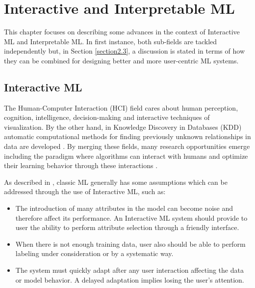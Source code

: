 
\chapter{Interactive and Interpretable ML}
\label{chapter2}

\graphicspath{{Chapter2/figs/}}

This chapter focuses on describing some advances in the context of Interactive ML and Interpretable ML. In first instance, both sub-fields are tackled independently but, in Section \ref{section2.3}, a discussion is stated in terms of how they can be combined for designing better and more user-centric ML systems.

\section{Interactive ML} %
\label{section2.1}

The Human-Computer Interaction (HCI) field cares about human perception, cognition, intelligence, decision-making and interactive techniques of visualization. By the other hand, in Knowledge Discovery in Databases (KDD) automatic computational methods for finding previously unknown relationships in data are developed \cite{Holzinger2013}. By merging these fields, many research opportunities emerge including the paradigm where algorithms can interact with humans and optimize their learning behavior through these interactions \cite{Holzinger2016}. 

As described in \cite{Fails2003}, classic ML generally has some assumptions which can be addressed through the use of Interactive ML, such as:

\begin{itemize}
\item The introduction of many attributes in the model can become noise and therefore affect its performance. An Interactive ML system should provide to user the ability to perform attribute selection through a friendly interface.
\item When there is not enough training data, user also should be able to perform labeling under consideration or by a systematic way.
\item The system must quickly adapt after any user interaction affecting the data or model behavior. A delayed adaptation implies losing the user's attention.
\end{itemize}

